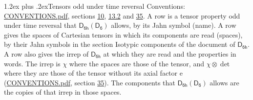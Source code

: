 \documentclass[10pt,a4paper]{article}
\makeatletter
\renewcommand\section{\@startsection{section}{1}{\z@}{-3ex plus -1ex minus -.2ex}%
  {1.2ex plus .2ex}{\normalfont\large\sffamily\bfseries\color{parttitle}}}
\numberwithin{equation}{section}
\newcommand{\grp}[1]{\mathsf{#1}}
\newcommand{\irrprod}{\otimes}
\makeatother
\begin{document}
\section{Tensors odd under time reversal}\label{s:time_odd}
Conventions: \href{../../CONVENTIONS.pdf}{CONVENTIONS.pdf}, sections \href{../../../rotation/CONVENTIONS.pdf\#conv.10}{10}, \href{../../../rotation/CONVENTIONS.pdf\#conv.13.2}{13.2} and \href{../../CONVENTIONS.pdf\#conv.35}{35}.
\leavevmode\label{n:head.name.property}A row is a tensor property odd under time reversal that $\grp{D_{6h}}(\grp{D_{6}})$ allows, by its Jahn symbol (name). \label{n:head.spaces}A row gives the spaces of Cartesian tensors in which its components are read (spaces), by their Jahn symbols in the section Isotypic components of the document of \href{../../../rotation/data/pdf/D6h.pdf}{$\grp{D_{6h}}$}. \label{n:head.properties}A row also gives the irrep of $\grp{D_{6h}}$ at which they are read and the properties in words. The irrep is $\chi$ where the spaces are those of the tensor, and $\chi \irrprod \det$ where they are those of the tensor without its axial factor e (\href{../../CONVENTIONS.pdf}{CONVENTIONS.pdf}, section \href{../../CONVENTIONS.pdf\#conv.35}{35}). The components that $\grp{D_{6h}}(\grp{D_{6}})$ allows are the copies of that irrep in those spaces.
\end{document}
